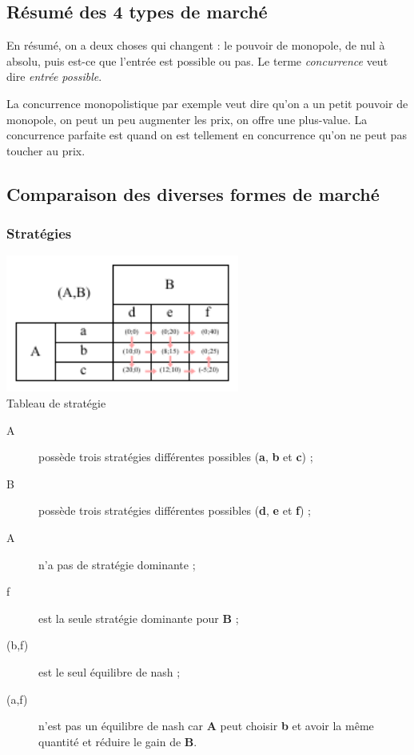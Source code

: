 \subsection{Résumé des 4 types de marché}
En résumé, on a deux choses qui changent : le pouvoir de monopole, de nul à absolu, puis est-ce que l'entrée est possible ou pas. Le terme \textit{concurrence} veut dire \textit{entrée possible}.

La concurrence monopolistique par exemple veut dire qu'on a un petit pouvoir de monopole, on peut un peu augmenter
les prix, on offre une plus-value. La concurrence parfaite est quand on est tellement en concurrence qu'on ne peut pas toucher au prix.






\subsection{Comparaison des diverses formes de marché}



\subsubsection{Stratégies}


\begin{center}
	\includegraphics[height=4.5cm]{images/strategie.pdf}\\
	Tableau de stratégie
\end{center}
\begin{description}
	\item [A] possède trois stratégies différentes possibles (\textbf{a}, \textbf{b} et \textbf{c}) ;
	\item [B] possède trois stratégies différentes possibles (\textbf{d}, \textbf{e} et \textbf{f}) ;
	\item [A] n'a pas de stratégie dominante ;
	\item [f] est la seule stratégie dominante pour \textbf{B} ;
	\item [(b,f)] est le seul équilibre de nash ;
	\item [(a,f)] n'est pas un équilibre de nash car \textbf{A} peut choisir \textbf{b} et avoir la même quantité et réduire le gain de \textbf{B}.
\end{description}